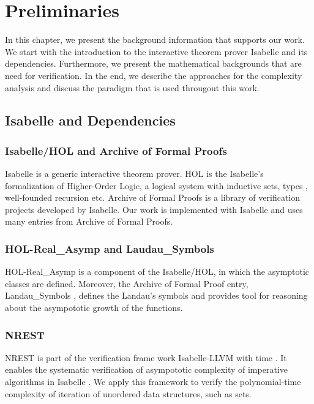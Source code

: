 \newcommand{\red}{\leq_p}
\newcommand{\problem}[3]{
\begin{definition}
    {#1} \\
    \textbf{Input}: {#2}\\
    \textbf{Output}: {#3}
\end{definition}
}
\newcommand{\bigO}[1]{\mathcal{O}({#1})}

\chapter{Preliminaries}\label{chapter:preliminaries}
In this chapter, we present the background information that supports our work. 
We start with the introduction to the interactive theorem prover Isabelle and its dependencies. 
Furthermore, we present the mathematical backgrounds that are need for verification. 
In the end, we describe the approaches for the complexity analysis and discuss the paradigm 
that is used througout this work.
\section{Isabelle and Dependencies}
\subsection*{Isabelle/HOL and Archive of Formal Proofs}
Isabelle \cite{wenzel2004isabelle} is a generic interactive theorem prover. HOL is the Isabelle's formalization of Higher-Order Logic, 
a logical system with inductive sets, types , well-founded recursion etc. 
Archive of Formal Proofs \cite{AFP} is a library of verification projects developed by Isabelle. 
Our work is implemented with Isabelle and uses many entries from Archive of Formal 
Proofs.

\subsection*{HOL-Real\_Asymp and Laudau\_Symbols}
HOL-Real\_Asymp is a component of the Isabelle/HOL, in which the asymptotic 
classes are defined. Moreover, the Archive of Formal Proof entry, Landau\_Symbols \cite{Landau_Symbols-AFP}, 
defines the Landau's symbols and provides tool for reasoning about the asympototic
growth of the functions. 

\subsection*{NREST}
NREST is part of the verification frame work Isabelle-LLVM with time \cite{haslbeck2021verified}. It enables 
the systematic verification of asympototic complexity of imperative algorithms in Isabelle \cite{zhan2018verifying}. 
We apply this framework 
to verify the polynomial-time complexity of iteration of unordered data structures, such as sets.

